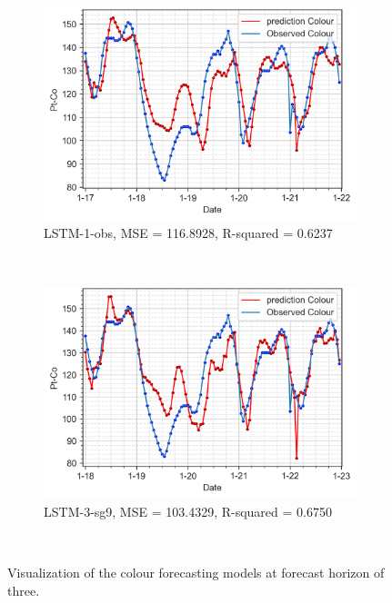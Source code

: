 \begin{figure}[!ht]
  \centering
  \begin{subfigure}[t]{0.7\textwidth}
    \includegraphics[width=\linewidth]{imgs/results/steps/colour-lstm-1-fc3.png}
    \caption{LSTM-1-obs, MSE = 116.8928, R-squared = 0.6237} \label{fig:colour-lstm-1-fc3}
  \end{subfigure}\\
  \vspace{1em}
  \begin{subfigure}[t]{0.7\textwidth}
    \includegraphics[width=\linewidth]{imgs/results/steps/colour-lstm-3-fc3.png}
    \caption{LSTM-3-sg9, MSE = 103.4329, R-squared = 0.6750} \label{fig:colour-lstm-3-fc3}
  \end{subfigure}\\
\caption{Visualization of the colour forecasting models at forecast horizon of three.} \label{fig:colour-forecast-fc3}
\end{figure}

